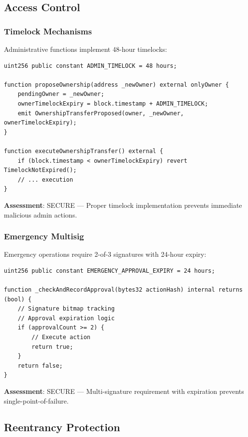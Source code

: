 \documentclass[12pt,a4paper]{article}
\begin{document}
\subsection{Access Control}

\subsubsection{Timelock Mechanisms}

Administrative functions implement 48-hour timelocks:

\begin{lstlisting}[language=Solidity]
uint256 public constant ADMIN_TIMELOCK = 48 hours;

function proposeOwnership(address _newOwner) external onlyOwner {
    pendingOwner = _newOwner;
    ownerTimelockExpiry = block.timestamp + ADMIN_TIMELOCK;
    emit OwnershipTransferProposed(owner, _newOwner, ownerTimelockExpiry);
}

function executeOwnershipTransfer() external {
    if (block.timestamp < ownerTimelockExpiry) revert TimelockNotExpired();
    // ... execution
}
\end{lstlisting}

\textbf{Assessment}: \textcolor{lowsev}{SECURE} --- Proper timelock implementation prevents immediate malicious admin actions.

\subsubsection{Emergency Multisig}

Emergency operations require 2-of-3 signatures with 24-hour expiry:

\begin{lstlisting}[language=Solidity]
uint256 public constant EMERGENCY_APPROVAL_EXPIRY = 24 hours;

function _checkAndRecordApproval(bytes32 actionHash) internal returns (bool) {
    // Signature bitmap tracking
    // Approval expiration logic
    if (approvalCount >= 2) {
        // Execute action
        return true;
    }
    return false;
}
\end{lstlisting}

\textbf{Assessment}: \textcolor{lowsev}{SECURE} --- Multi-signature requirement with expiration prevents single-point-of-failure.

\subsection{Reentrancy Protection}
\end{document}
